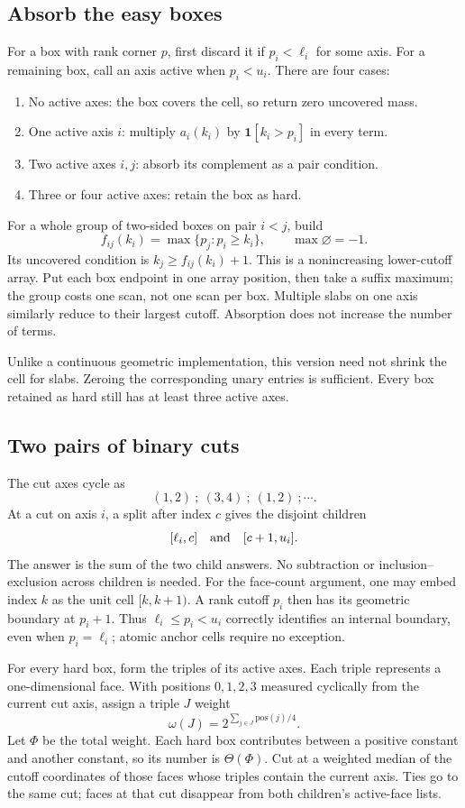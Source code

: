 \documentclass[12pt,a4paper]{article}
\theoremstyle{remark}
\newcommand{\1}{\mathbf1}
\begin{document}
\subsection{Absorb the easy boxes}
For a box with rank corner $p$, first discard it if $p_i<\ell_i$ for
some axis. For a remaining box, call an axis active when $p_i<u_i$.
There are four cases:
\begin{enumerate}
\item No active axes: the box covers the cell, so return zero uncovered mass.
\item One active axis $i$: multiply $a_i(k_i)$ by $\1[k_i>p_i]$ in every term.
\item Two active axes $i,j$: absorb its complement as a pair condition.
\item Three or four active axes: retain the box as hard.
\end{enumerate}
For a whole group of two-sided boxes on pair $i<j$, build
\[
 f_{ij}(k_i)=\max\{p_j:p_i\ge k_i\},\qquad\max\varnothing=-1.
\]
Its uncovered condition is $k_j\ge f_{ij}(k_i)+1$. This is a nonincreasing
lower-cutoff array. Put each box endpoint in one array position, then take
a suffix maximum; the group costs one scan, not one scan per box.
Multiple slabs on one axis similarly reduce to their largest cutoff.
Absorption does not increase the number of terms.

Unlike a continuous geometric implementation, this version need not shrink
the cell for slabs. Zeroing the corresponding unary entries is sufficient.
Every box retained as hard still has at least three active axes.

\subsection{Two pairs of binary cuts}
The cut axes cycle as
\[
                    (1,2)\ ;\ (3,4)\ ;\ (1,2)\ ;\cdots.
\]
At a cut on axis $i$, a split after index $c$ gives the disjoint children
\[
       [\ell_i,c]\quad\hbox{and}\quad[c+1,u_i].
\]
The answer is the sum of the two child answers. No subtraction or
inclusion--exclusion across children is needed. For the face-count argument,
one may embed index $k$ as the unit cell $[k,k+1)$. A rank cutoff $p_i$
then has its geometric boundary at $p_i+1$. Thus $\ell_i\le p_i<u_i$
correctly identifies an internal boundary, even when $p_i=\ell_i$;
atomic anchor cells require no exception.

For every hard box, form the triples of its active axes. Each triple
represents a one-dimensional face. With positions $0,1,2,3$ measured
cyclically from the current cut axis, assign a triple $J$ weight
\begin{equation}
                      \omega(J)=2^{\sum_{j\in J}\mathrm{pos}(j)/4}.
                                                        \label{eq:weights}
\end{equation}
Let $\Phi$ be the total weight. Each hard box contributes between a
positive constant and another constant, so its number is $\Theta(\Phi)$.
Cut at a weighted median of the cutoff coordinates of those faces whose
triples contain the current axis. Ties go to the same cut; faces at that
cut disappear from both children's active-face lists.
\end{document}
